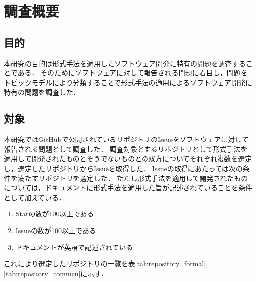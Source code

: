 \documentclass[main]{subfiles}
\begin{document}
\chapter{調査概要}

\section{目的}

本研究の目的は形式手法を適用したソフトウェア開発に特有の問題を調査することである．
そのためにソフトウェアに対して報告される問題に着目し，問題をトピックモデルにより分類することで形式手法の適用によるソフトウェア開発に特有の問題を調査した．


\section{対象}

本研究ではGitHubで公開されているリポジトリのIssueをソフトウェアに対して報告される問題として調査した．
調査対象とするリポジトリとして形式手法を適用して開発されたものとそうでないものとの双方についてそれぞれ複数を選定し，選定したリポジトリからIssueを取得した．
Issueの取得にあたっては次の条件を満たすリポジトリを選定した．
ただし形式手法を適用して開発されたものについては，ドキュメントに形式手法を適用した旨が記述されていることを条件として加えている．

\begin{enumerate}
	\item Starの数が100以上である
	\item Issueの数が100以上である
	\item ドキュメントが英語で記述されている
\end{enumerate}

これにより選定したリポジトリの一覧を表\ref{tab:repository_formal}, \ref{tab:repository_common}に示す．


\end{document}
